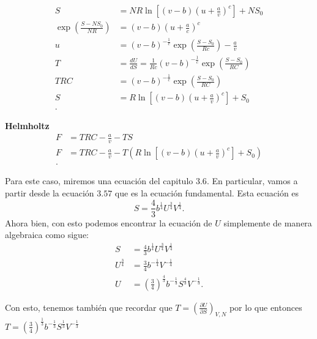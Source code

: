 \documentclass{report}
\begin{document}
\sol

\begin{align*}
  S&=NR\ln\left[ (v-b)\left( u + \frac{a}{v} \right)^c \right] + NS_0\\
  \exp\left( \frac{S-NS_0}{NR} \right) &= (v-b)\left( u+\frac{a}{c} \right)^c\\
  u &= (v-b)^{-\frac{1}{c}}\exp\left( \frac{S-S_0}{Rc} \right) - \frac{a}{v} \\
  T&= \frac{dU}{dS}=\frac{1}{Rc}(v-b)^{-\frac{1}{c}}\exp\left( \frac{S-S_0}{RC} \right)  \\
  TRC &= \left( v-b \right)^{-\frac{1}{c}}\exp\left( \frac{S-S_0}{RC} \right)  \\
  S&= R\ln\left[ (v-b)\left( u+\frac{a}{v} \right)^c \right] + S_0 \\
.\end{align*}

\textbf{Helmholtz}
\begin{align*}
  F&= TRC-\frac{a}{v}-TS \\
  F &= TRC - \frac{a}{v}-T\left( R\ln\left[ (v-b)\left( u+\frac{a}{v} \right)^c \right] + S_0 \right)  \\
.\end{align*}


\sol

Para este caso, miremos una ecuación del capitulo $3.6$. En particular, vamos a partir desde la ecuación $3.57$ que es la ecuación fundamental. Esta ecuación es  \[
  S=\frac{4}{3}b^{\frac{1}{4}}U^{\frac{3}{4}}V^{\frac{1}{4}}
.\] Ahora bien, con esto podemos encontrar la ecuación de $U$ simplemente de manera algebraica como sigue:
\begin{align*}
  S&=\frac{4}{3}b^{\frac{1}{4}}U^{\frac{3}{4}}V^{\frac{1}{4}}  \\
  U^{\frac{3}{4}} &= \frac{3}{4}b^{-\frac{1}{4}}V^{-\frac{1}{4}} \\
  U &= \left( \frac{3}{4} \right)^{\frac{4}{3}}b^{-\frac{1}{3}}S^{\frac{4}{3}}V^{-\frac{1}{3}} 
.\end{align*}

Con esto, tenemos también que recordar que $T= \left( \frac{\partial U}{\partial S} \right)_{V,N}$ por lo que entonces $T=\left( \frac{3}{4} \right)^{\frac{1}{3}}b^{-\frac{1}{3}}S^{\frac{1}{3}}V^{-\frac{1}{3}}$
\end{document}
